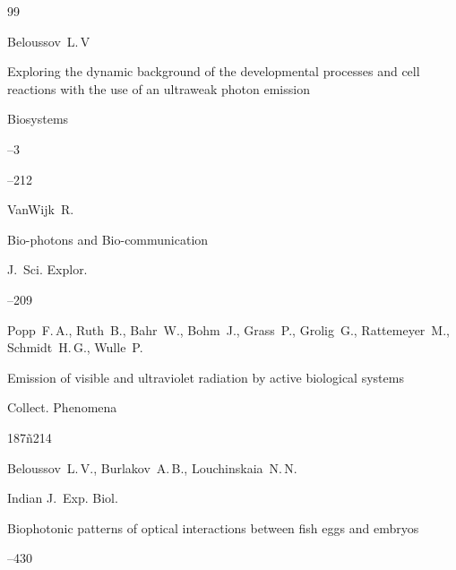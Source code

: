 \begin{thebibliography}{99}




\by Beloussov~L.\,V

\paper Exploring the dynamic background of the developmental processes and cell reactions with the use of an ultraweak photon emission 

\jour Biosystems


--3

--212







\by VanWijk~R.

\paper Bio-photons and Bio-communication

\jour J.~Sci. Explor.



--209





\by Popp~F.\,A.,  Ruth~B., Bahr~W.,  Bohm~J., Grass~P.,  Grolig~G., Rattemeyer~M., Schmidt~H.\,G., Wulle~P.

\paper Emission of visible and ultraviolet radiation by active biological systems

\jour Collect. Phenomena


\pages 187ñ214











\by Beloussov~L.\,V., Burlakov~A.\,B., Louchinskaia~N.\,N.

\jour   Indian J.~Exp. Biol.

\paper Biophotonic patterns of optical interactions between fish eggs and embryos



--430







\end{thebibliography}
